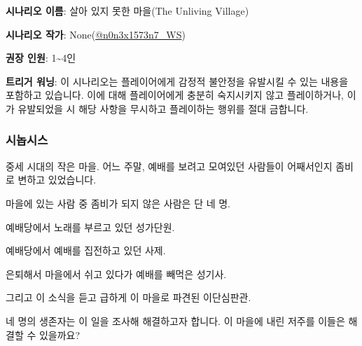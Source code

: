 \documentclass{report}
\begin{document}
	\textbf{시나리오 이름}: 살아 있지 못한 마을(The Unliving Village)
	
	\textbf{시나리오 작가}: None(\href{https://www.twitter.com/n0n3x1573n7_WS}{@n0n3x1573n7\_WS})
	
	\textbf{권장 인원}: 1\textasciitilde4인
	
	\textbf{트리거 워닝}: 이 시나리오는 플레이어에게 감정적 불안정을 유발시킬 수 있는 내용을 포함하고 있습니다. 이에 대해 플레이어에게 충분히 숙지시키지 않고 플레이하거나, 이가 유발되었을 시 해당 사항을 무시하고 플레이하는 행위를 절대 금합니다.
	
	\subsubsection*{시놉시스}
	
	중세 시대의 작은 마을. 어느 주말, 예배를 보려고 모여있던 사람들이 어째서인지 좀비로 변하고 있었습니다.
	
	마을에 있는 사람 중 좀비가 되지 않은 사람은 단 네 명.
	
	예배당에서 노래를 부르고 있던 성가단원.
	
	예배당에서 예배를 집전하고 있던 사제.
	
	은퇴해서 마을에서 쉬고 있다가 예배를 빼먹은 성기사.
	
	그리고 이 소식을 듣고 급하게 이 마을로 파견된 이단심판관.
	
	네 명의 생존자는 이 일을 조사해 해결하고자 합니다. 이 마을에 내린 저주를 이들은 해결할 수 있을까요?
\end{document}
